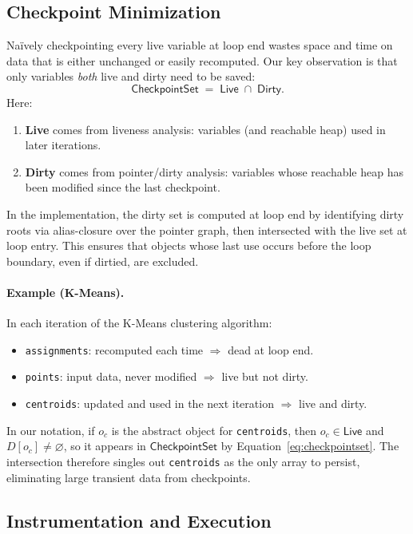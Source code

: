 \subsection{Checkpoint Minimization}
Naïvely checkpointing every live variable at loop end wastes space and time on data
that is either unchanged or easily recomputed. Our key observation is that only
variables \emph{both} live and dirty need to be saved:
\begin{equation}
    \label{eq:checkpointset}
    \mathsf{CheckpointSet} \;=\; \mathsf{Live} \;\cap\; \mathsf{Dirty}.
\end{equation}
Here:
\begin{enumerate}
    \item \textbf{Live} comes from liveness analysis: variables (and reachable heap)
    used in later iterations.
    \item \textbf{Dirty} comes from pointer/dirty analysis: variables whose reachable heap
    has been modified since the last checkpoint.
\end{enumerate}
In the implementation, the dirty set is computed at loop end by identifying dirty roots
via alias-closure over the pointer graph, then intersected with the live set at loop entry.
This ensures that objects whose last use occurs before the loop boundary, even if dirtied,
are excluded.

\paragraph{Example (K-Means).}
In each iteration of the K-Means clustering algorithm:
\begin{itemize}
    \item \texttt{assignments}: recomputed each time $\Rightarrow$ dead at loop end.
    \item \texttt{points}: input data, never modified $\Rightarrow$ live but not dirty.
    \item \texttt{centroids}: updated and used in the next iteration $\Rightarrow$ live and dirty.
\end{itemize}
In our notation, if $o_c$ is the abstract object for \texttt{centroids}, then
$o_c \in \mathsf{Live}$ and $D[o_c] \neq \varnothing$, so it appears in
$\mathsf{CheckpointSet}$ by Equation~\eqref{eq:checkpointset}.
The intersection therefore singles out \texttt{centroids} as the only array to persist,
eliminating large transient data from checkpoints.

\subsection{Instrumentation and Execution}

